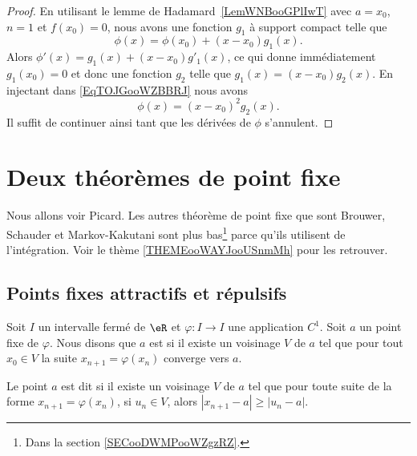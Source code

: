 \begin{proof}
	En utilisant le lemme de Hadamard~\ref{LemWNBooGPlIwT} avec \( a=x_0\), \( n=1\) et \( f(x_0)=0\), nous avons une fonction \( g_1\) à support compact telle que
	\begin{equation}        \label{EqTOJGooWZBBRJ}
		\phi(x)=\phi(x_0)+(x-x_0)g_1(x).
	\end{equation}
	Alors \( \phi'(x)=g_1(x)+(x-x_0)g'_1(x)\), ce qui donne immédiatement \( g_1(x_0)=0\) et donc une fonction \( g_2\) telle que \( g_1(x)=(x-x_0)g_2(x)\). En injectant dans \eqref{EqTOJGooWZBBRJ} nous avons
	\begin{equation}
		\phi(x)=(x-x_0)^2g_2(x).
	\end{equation}
	Il suffit de continuer ainsi tant que les dérivées de \( \phi\) s'annulent.
\end{proof}

\section{Deux théorèmes de point fixe}

Nous allons voir Picard. Les autres théorème de point fixe que sont Brouwer, Schauder et Markov-Kakutani sont plus bas\footnote{Dans la section \ref{SECooDWMPooWZgzRZ}.} parce qu'ils utilisent de l'intégration. Voir le thème \ref{THEMEooWAYJooUSnmMh} pour les retrouver.

\subsection{Points fixes attractifs et répulsifs}

\begin{definition}      \label{DEFooTMZUooMoBDGC}
	Soit \( I\) un intervalle fermé de \( \eR\) et \( \varphi\colon I\to I\) une application \( C^1\). Soit \( a\) un point fixe de \( \varphi\). Nous disons que \( a\) est  si il existe un voisinage \( V\) de \( a\) tel que pour tout \( x_0\in V\) la suite \( x_{n+1}=\varphi(x_n)\) converge vers \( a\).

	Le point \( a\) est dit  si il existe un voisinage \( V\) de \( a\) tel que pour toute suite de la forme \( x_{n+1}=\varphi(x_n) \), si \( u_n\in V\), alors \( | x_{n+1}-a |\geq | u_n-a |\).
\end{definition}

